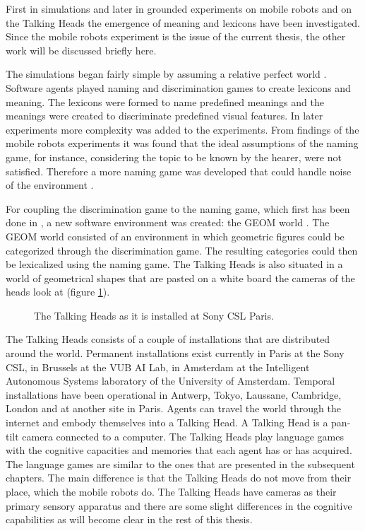 \p
First in simulations \cite{steels:1996a,steels:1996b} and later in grounded experiments on mobile robots \cite{steelsvogt:1997,vogt:1998a,vogt:1998b,dejongvogt:1998} and on the Talking Heads \cite{belpaeme:1998,kaplan:2000,steels:2000} the emergence of meaning and lexicons have been investigated. Since the mobile robots experiment is the issue of the current thesis, the other work will be discussed briefly here. 

The simulations began fairly simple by assuming a relative perfect world \cite{steels:1996a,steels:1996b}. Software agents played naming and discrimination games to create lexicons and meaning. The lexicons were formed to name predefined meanings and the meanings were created to discriminate predefined visual features. In later experiments more complexity was added to the experiments. From findings of the mobile robots experiments \cite{vogt:1998a} it was found that the ideal assumptions of the naming game, for instance, considering the topic to be known by the hearer, were not satisfied. Therefore a more  naming game was developed that could handle noise of the environment \cite{steelskaplan:1998}. 

For coupling the discrimination game to the naming game, which first has been done in \cite{steelsvogt:1997}, a new software environment was created: the GEOM world \cite{steels:2000}. The GEOM world consisted of an environment in which geometric figures could be categorized through the discrimination game. The resulting categories could then be lexicalized using the naming game. The Talking Heads is also situated in a world of geometrical shapes that are pasted on a white board the cameras of the heads look at (figure \ref{f:theory:talkingheads}).

\begin{figure}
\centering
{}
\caption{The Talking Heads as it is installed at Sony CSL Paris.}
\label{f:theory:talkingheads}
\end{figure}

The Talking Heads consists of a couple of installations that are distributed around the world. Permanent installations exist currently in Paris at the Sony CSL, in Brussels at the VUB AI Lab, in Amsterdam at the Intelligent Autonomous Systems laboratory of the University of Amsterdam. Temporal installations have been operational in Antwerp, Tokyo, Laussane, Cambridge, London and at another site in Paris. Agents can travel the world through the internet and embody themselves into a Talking Head. A Talking Head is a pan-tilt camera connected to a computer. The Talking Heads play language games with the cognitive capacities and memories that each agent has or has acquired. The language games are similar to the ones that are presented in the subsequent chapters. The main difference is that the Talking Heads do not move from their place, which the mobile robots do. The Talking Heads have cameras as their primary sensory apparatus and there are some slight differences in the cognitive capabilities as will become clear in the rest of this thesis.


